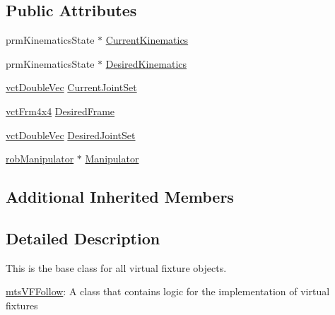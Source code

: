 \subsection*{Public Attributes}
\begin{DoxyCompactItemize}
\item 
prm\-Kinematics\-State $\ast$ \hyperlink{classmts_v_f_follow_af2d523404ee1df9df0c2346ba9a419cd}{Current\-Kinematics}
\item 
prm\-Kinematics\-State $\ast$ \hyperlink{classmts_v_f_follow_a875d4d21dbe800b29573458c35e33fe2}{Desired\-Kinematics}
\item 
\hyperlink{vct_dynamic_vector_types_8h_ade4b3068c86fb88f41af2e5187e491c2}{vct\-Double\-Vec} \hyperlink{classmts_v_f_follow_ae704f3167a578520448f6f47aa032aff}{Current\-Joint\-Set}
\item 
\hyperlink{vct_transformation_types_8h_a33da47f4deb2556b37a69a2c44b29d75}{vct\-Frm4x4} \hyperlink{classmts_v_f_follow_a3561088c012af44b6dcd0a54f6fce5ae}{Desired\-Frame}
\item 
\hyperlink{vct_dynamic_vector_types_8h_ade4b3068c86fb88f41af2e5187e491c2}{vct\-Double\-Vec} \hyperlink{classmts_v_f_follow_ae4c68fd6c7d03a6bcdb86d1e2e5dae60}{Desired\-Joint\-Set}
\item 
\hyperlink{classrob_manipulator}{rob\-Manipulator} $\ast$ \hyperlink{classmts_v_f_follow_ad30c27f37797a47a2461551aab20103a}{Manipulator}
\end{DoxyCompactItemize}
\subsection*{Additional Inherited Members}


\subsection{Detailed Description}
This is the base class for all virtual fixture objects. 

\hyperlink{classmts_v_f_follow}{mts\-V\-F\-Follow}\-: A class that contains logic for the implementation of virtual fixtures 

